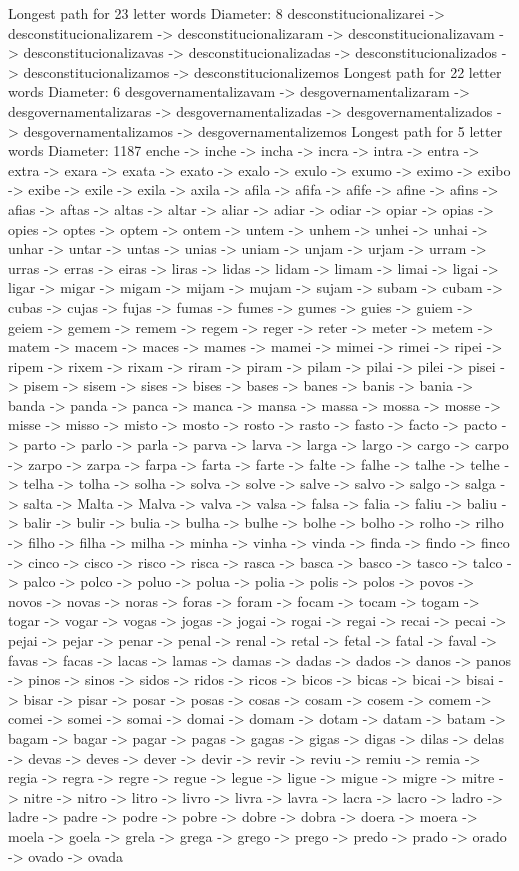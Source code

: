 \documentclass[a4paper,11pt]{article}
\begin{document}
Longest path for 23 letter words
Diameter: 8
desconstitucionalizarei -> desconstitucionalizarem -> desconstitucionalizaram -> desconstitucionalizavam -> desconstitucionalizavas -> desconstitucionalizadas -> desconstitucionalizados -> desconstitucionalizamos -> desconstitucionalizemos
Longest path for 22 letter words
Diameter: 6
desgovernamentalizavam -> desgovernamentalizaram -> desgovernamentalizaras -> desgovernamentalizadas -> desgovernamentalizados -> desgovernamentalizamos -> desgovernamentalizemos
Longest path for 5 letter words
Diameter: 1187
enche -> inche -> incha -> incra -> intra -> entra -> extra -> exara -> exata -> exato -> exalo -> exulo -> exumo -> eximo -> exibo -> exibe -> exile -> exila -> axila -> afila -> afifa -> afife -> afine -> afins -> afias -> aftas -> altas -> altar -> aliar -> adiar -> odiar -> opiar -> opias -> opies -> optes -> optem -> ontem -> untem -> unhem -> unhei -> unhai -> unhar -> untar -> untas -> unias -> uniam -> unjam -> urjam -> urram -> urras -> erras -> eiras -> liras -> lidas -> lidam -> limam -> limai -> ligai -> ligar -> migar -> migam -> mijam -> mujam -> sujam -> subam -> cubam -> cubas -> cujas -> fujas -> fumas -> fumes -> gumes -> guies -> guiem -> geiem -> gemem -> remem -> regem -> reger -> reter -> meter -> metem -> matem -> macem -> maces -> mames -> mamei -> mimei -> rimei -> ripei -> ripem -> rixem -> rixam -> riram -> piram -> pilam -> pilai -> pilei -> pisei -> pisem -> sisem -> sises -> bises -> bases -> banes -> banis -> bania -> banda -> panda -> panca -> manca -> mansa -> massa -> mossa -> mosse -> misse -> misso -> misto -> mosto -> rosto -> rasto -> fasto -> facto -> pacto -> parto -> parlo -> parla -> parva -> larva -> larga -> largo -> cargo -> carpo -> zarpo -> zarpa -> farpa -> farta -> farte -> falte -> falhe -> talhe -> telhe -> telha -> tolha -> solha -> solva -> solve -> salve -> salvo -> salgo -> salga -> salta -> Malta -> Malva -> valva -> valsa -> falsa -> falia -> faliu -> baliu -> balir -> bulir -> bulia -> bulha -> bulhe -> bolhe -> bolho -> rolho -> rilho -> filho -> filha -> milha -> minha -> vinha -> vinda -> finda -> findo -> finco -> cinco -> cisco -> risco -> risca -> rasca -> basca -> basco -> tasco -> talco -> palco -> polco -> poluo -> polua -> polia -> polis -> polos -> povos -> novos -> novas -> noras -> foras -> foram -> focam -> tocam -> togam -> togar -> vogar -> vogas -> jogas -> jogai -> rogai -> regai -> recai -> pecai -> pejai -> pejar -> penar -> penal -> renal -> retal -> fetal -> fatal -> faval -> favas -> facas -> lacas -> lamas -> damas -> dadas -> dados -> danos -> panos -> pinos -> sinos -> sidos -> ridos -> ricos -> bicos -> bicas -> bicai -> bisai -> bisar -> pisar -> posar -> posas -> cosas -> cosam -> cosem -> comem -> comei -> somei -> somai -> domai -> domam -> dotam -> datam -> batam -> bagam -> bagar -> pagar -> pagas -> gagas -> gigas -> digas -> dilas -> delas -> devas -> deves -> dever -> devir -> revir -> reviu -> remiu -> remia -> regia -> regra -> regre -> regue -> legue -> ligue -> migue -> migre -> mitre -> nitre -> nitro -> litro -> livro -> livra -> lavra -> lacra -> lacro -> ladro -> ladre -> padre -> podre -> pobre -> dobre -> dobra -> doera -> moera -> moela -> goela -> grela -> grega -> grego -> prego -> predo -> prado -> orado -> ovado -> ovada 
\end{document}
